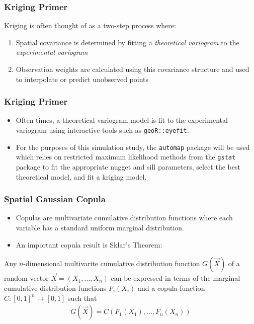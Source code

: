 \documentclass{beamer}
\begin{document}
\begin{frame}
	\frametitle{Kriging Primer}
	Kriging is often thought of as a two-step process where:
	\begin{enumerate}
		\item Spatial covariance is determined by fitting a \textit{theoretical variogram} to the \textit{experimental variogram}
		\item Observation weights are calculated using this covariance structure and used to interpolate or predict unobserved points
	\end{enumerate}
\end{frame}

\begin{frame}
	\frametitle{Kriging Primer}
	\begin{itemize}
	\item Often times, a theoretical variogram model is fit to the experimental variogram using interactive tools such as \texttt{geoR::eyefit}. 
	\item For the purposes of this simulation study, the \texttt{automap} package will be used which relies on restricted maximum likelihood methods from the \texttt{gstat} package to fit the appropriate nugget and sill parameters, select the best theoretical model, and fit a kriging model.
	\end{itemize}
\end{frame}

\begin{frame}
	\frametitle{Spatial Gaussian Copula}
	\begin{itemize}
	\item Copulas are multivariate cumulative distribution functions where each variable has a standard uniform marginal distribution.
	\item An important copula result is Sklar's Theorem:
	\end{itemize}
	\begin{theorem}	
	Any $n$-dimensional multivarite cumulative distribution function $G(\vec{X})$ of a random vector $\vec{X} = (X_1, \ldots ,X_n)$ can be expressed in terms of the marginal cumulative distribution functions $F_i(X_i)$ and a copula function $C: [0,1]^n \rightarrow [0,1]$ such that
		\begin{align*}
			G(\vec{X}) = C(F_1(X_1), \ldots, F_n(X_n))
		\end{align*}
	\end{theorem}
\end{frame}
\end{document}
